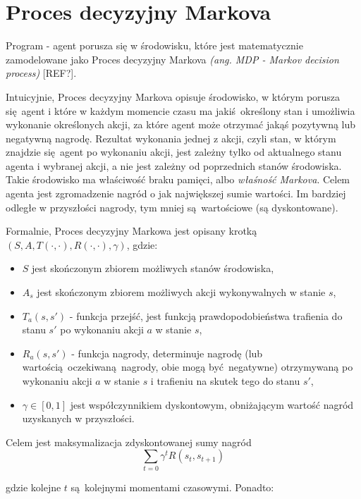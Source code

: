 \section{Proces decyzyjny Markova}\label{mdp}

Program - agent porusza się w środowisku, które jest matematycznie zamodelowane jako Proces decyzyjny Markova \textit{(ang. MDP - Markov decision process)} [REF?].

Intuicyjnie, Proces decyzyjny Markova opisuje środowisko, w którym porusza się agent i które w każdym momencie czasu ma jakiś określony stan i umożliwia wykonanie określonych akcji, za które agent może otrzymać jakąś pozytywną lub negatywną nagrodę. Rezultat wykonania jednej z akcji, czyli stan, w którym znajdzie się agent po wykonaniu akcji, jest zależny tylko od aktualnego stanu agenta i wybranej akcji, a nie jest zależny od poprzednich stanów środowiska. Takie środowisko ma właściwość braku pamięci, albo \textit{właśność Markova}. Celem agenta jest zgromadzenie nagród o jak największej sumie wartości. Im bardziej odległe w przyszłości nagrody, tym mniej są wartościowe (są dyskontowane).

\vspace{5mm}

Formalnie, Proces decyzyjny Markowa jest opisany krotką $(S,A,T(\cdot,\cdot),R(\cdot,\cdot),\gamma)$, gdzie:
\begin{itemize}
\item $S$ jest skończonym zbiorem możliwych stanów środowiska,
\item $A_s$ jest skończonym zbiorem możliwych akcji wykonywalnych w stanie $s$,
\item $T_a(s,s')$ - funkcja przejść, jest funkcją prawdopodobieństwa trafienia do stanu $s'$ po wykonaniu akcji $a$ w stanie $s$,
\item $R_a(s,s')$ - funkcja nagrody, determinuje nagrodę (lub wartością oczekiwaną nagrody, obie mogą być negatywne) otrzymywaną po wykonaniu akcji $a$ w stanie $s$ i trafieniu na skutek tego do stanu $s'$,
\item $\gamma \in [0,1]$ jest współczynnikiem dyskontowym, obniżającym wartość nagród uzyskanych w przyszłości.
\end{itemize}

Celem jest maksymalizacja zdyskontowanej sumy nagród $$\sum_{t=0}{\gamma^t R(s_t,s_{t+1})}$$

gdzie kolejne $t$ są kolejnymi momentami czasowymi. Ponadto:

